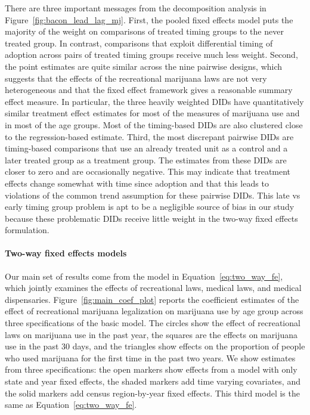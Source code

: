 \documentclass[12pt]{article}%
\begin{document}
There are three important messages from the decomposition analysis in Figure~\ref{fig:bacon_lead_lag_mj}. First, the pooled fixed effects model puts the majority of the weight on comparisons of treated timing groups to the never treated group. In contrast, comparisons that exploit differential timing of adoption across pairs of treated timing groups receive much less weight. Second, the point estimates are quite similar across the nine pairwise designs, which suggests that the effects of the recreational marijuana laws are not very heterogeneous and that the fixed effect framework gives a reasonable summary effect measure. In particular, the three heavily weighted DIDs have quantitatively similar treatment effect estimates for most of the measures of marijuana use and in most of the age groups. Most of the timing-based DIDs are also clustered close to the regression-based estimate. Third, the most discrepant pairwise DIDs are timing-based comparisons that use an already treated unit as a control and a later treated group as a treatment group. The estimates from these DIDs are closer to zero and are occasionally negative. This may indicate that treatment effects change somewhat with time since adoption and that this leads to violations of the common trend assumption for these pairwise DIDs. This late vs early timing group problem is apt to be a negligible  source of bias in our study because these problematic DIDs receive little weight in the two-way fixed effects formulation.

\paragraph{Two-way fixed effects models}
Our main set of results come from the model in Equation~\ref{eq:two_way_fe}, which jointly examines the effects of recreational laws, medical laws, and medical dispensaries. Figure~\ref{fig:main_coef_plot} reports the coefficient estimates of the effect of recreational marijuana legalization on marijuana use by age group across three specifications of the basic model. The circles show the effect of recreational laws on marijuana use in the past year, the squares are the effects on marijuana use in the past 30 days, and the triangles show effects on the proportion of people who used marijuana for the first time in the past two years. We show estimates from three specifications: the open markers show effects from a model with only state and year fixed effects, the shaded markers add time varying covariates, and the solid markers add census region-by-year fixed effects. This third model is the same as Equation~\ref{eq:two_way_fe}. 
\end{document}
